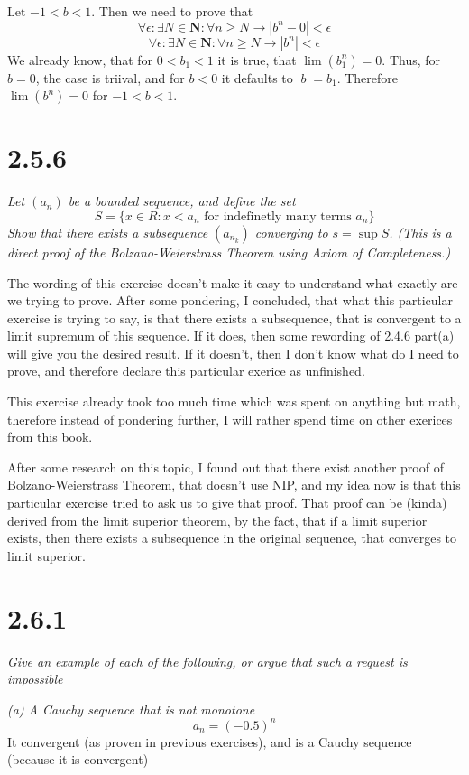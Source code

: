 \documentclass[11pt,oneside,titlepage]{book}
\begin{document}
Let $-1 < b < 1$. Then we need to prove that
$$\forall \epsilon: \exists N \in \textbf{N}: \forall n \geq N \to
|b^n - 0| < \epsilon$$
$$\forall \epsilon: \exists N \in \textbf{N}: \forall n \geq N \to
|b^n| < \epsilon$$
We already know, that for $0 < b_1 < 1$ it is true, that $\lim (b_1^n) = 0$.
Thus, for $b = 0$, the case is triival, and for $b < 0$ it defaults to
$|b| = b_1$. Therefore $\lim (b^n) = 0$ for $-1 < b < 1$.

\section*{2.5.6}
\textit{Let $(a_n)$ be a bounded sequence, and define the set }
$$S = \{x \in R: x < a_n \text{ for indefinetly many terms }a_n \}$$
\textit{Show that there exists a subsequence $(a_{n_k})$ converging to
  $s = \sup S$. (This is a direct proof of the Bolzano-Weierstrass Theorem
  using Axiom of Completeness.) }

The wording of this exercise doesn't make it easy to understand what exactly
are we trying to prove. After some pondering, I concluded, that what this
particular exercise is trying to say, is that there exists a subsequence,
that is convergent to a limit supremum of this sequence. If it does, then
some rewording of 2.4.6 part(a) will give you the desired result. If it
doesn't, then I don't know what do I need to prove, and therefore
declare this particular exerice as unfinished.

This exercise already took too much time which was spent on anything but
math, therefore instead of pondering further, I will rather spend time on
other exerices from this book.

After some research on this topic, I found out that there exist another
proof of Bolzano-Weierstrass Theorem, that doesn't use NIP, and my idea
now is that this particular exercise tried to ask us to give that proof.
That proof can be (kinda) derived from the limit superior theorem, by
the fact, that if a limit superior exists, then there exists 
a subsequence in the original sequence, that converges to limit
superior.

\section*{2.6.1}
\textit{Give an example of each of the following, or argue that such a request
  is impossible }

\textit{(a) A Cauchy sequence that is not monotone}
$$a_n = (-0.5)^n$$
It convergent (as proven in previous exercises), and is a Cauchy sequence
(because it is convergent)
\end{document}
